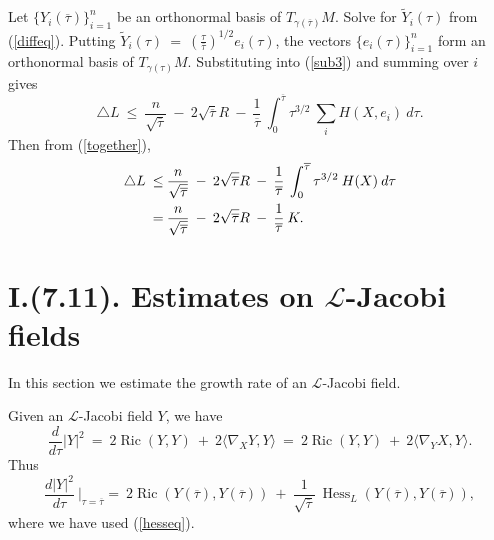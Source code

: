 \documentclass[12pt]{amsart}
\newcommand{\Hess}{\operatorname{Hess}}
\newcommand{\Ric}{\operatorname{Ric}}
\numberwithin{equation}{section}
\theoremstyle{plain}
\theoremstyle{definition}
\theoremstyle{remark}
\begin{document}
Let $\{Y_i(\overline{\tau})\}_{i=1}^n$ be an orthonormal basis of
$T_{\gamma(\overline{\tau})}M$.
Solve for $\widetilde{Y}_i(\tau)$ from (\ref{diffeq}).
Putting
$\widetilde{Y}_i(\tau) 
\: = \: \left( \frac{\tau}{\overline{\tau}} \right)^{1/2}
e_i(\tau)$,
the vectors $\{e_i(\tau)\}_{i=1}^n$ form an orthonormal basis of
$T_{\gamma(\tau)}M$.
Substituting into 
(\ref{sub3}) and summing over $i$ gives
\begin{equation}
\triangle L \: \le \: 
\frac{n}{\sqrt{\overline{\tau}}} \: - \: 2 \sqrt{\overline{\tau}} R
\: - \: \frac{1}{\overline{\tau}} \: \int_0^{\overline{\tau}} 
\tau^{3/2} \: \sum_i H(X, e_i) \: d\tau.
\end{equation}
Then from (\ref{together}),
\begin{align} \label{touse2}
\triangle L \: \le \: &
\frac{n}{\sqrt{\overline{\tau}}} \: - \: 2 \sqrt{\overline{\tau}} R
\: - \: \frac{1}{\overline{\tau}} \: \int_0^{\overline{\tau}} 
\tau^{3/2} \: H(X) \: d\tau \\
= \: & \frac{n}{\sqrt{\overline{\tau}}} \: - \: 2 \sqrt{\overline{\tau}} R
\: - \: \frac{1}{\overline{\tau}} \: K. \notag
\end{align}

\section{I.(7.11). Estimates on ${\mathcal L}$-Jacobi fields}

In this section we estimate the growth rate of an ${\mathcal L}$-Jacobi field.

Given an ${\mathcal L}$-Jacobi field $Y$, we have
\begin{equation}
\frac{d}{d\tau} |Y|^2 \: =\: 2 \Ric(Y, Y) \: + \: 2 \langle \nabla_X Y, Y
\rangle \: = \: 2 \Ric(Y, Y) \: + \: 2 \langle \nabla_Y X, Y \rangle.
\end{equation}
Thus
\begin{equation}
\frac{d |Y|^2}{d\tau} \: \Big|_{\tau = \overline{\tau}}
= \: 2 \Ric(Y(\overline{\tau}), Y(\overline{\tau})) 
\: + \: \frac{1}{\sqrt{\overline{\tau}}} \:
\Hess_L(Y(\overline{\tau}), Y(\overline{\tau})), 
\end{equation}
where we have used (\ref{hesseq}).
\end{document}
